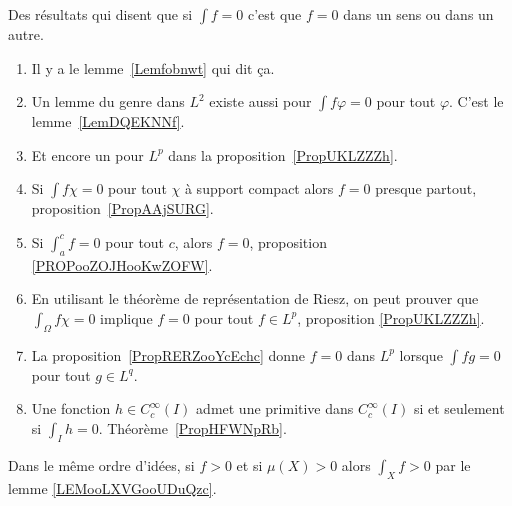 		\label{THEMEooDASVooWZLOjw}
Des résultats qui disent que si \( \int f=0\) c'est que \( f=0\) dans un sens ou dans un autre.
\begin{enumerate}
	\item
	      Il y a le lemme~\ref{Lemfobnwt} qui dit ça.
	\item
	      Un lemme du genre dans \( L^2\) existe aussi pour \( \int f\varphi=0\) pour tout \( \varphi\). C'est le lemme~\ref{LemDQEKNNf}.
	\item
	      Et encore un pour \( L^p\) dans la proposition~\ref{PropUKLZZZh}.
	\item
	      Si \( \int f\chi=0\) pour tout \( \chi\) à support compact alors \( f=0\) presque partout, proposition~\ref{PropAAjSURG}.
	\item
	      Si \( \int_a^cf=0\) pour tout \( c\), alors \( f=0\), proposition \ref{PROPooZOJHooKwZOFW}.
	\item
	      En utilisant le théorème de représentation de Riesz, on peut prouver que \( \int_{\Omega}f\chi=0\) implique \( f=0\) pour tout \( f\in L^p\), proposition \ref{PropUKLZZZh}.
	\item
	      La proposition~\ref{PropRERZooYcEchc} donne \( f=0\) dans \( L^p\) lorsque \( \int fg=0\) pour tout \( g\in L^q\).
	\item
	      Une fonction \( h\in C^{\infty}_c(I)\) admet une primitive dans \(  C^{\infty}_c(I)\) si et seulement si \( \int_Ih=0\). Théorème~\ref{PropHFWNpRb}.
\end{enumerate}

Dans le même ordre d'idées, si \( f>0\) et si \( \mu(X)>0\) alors \( \int_Xf>0\) par le lemme \ref{LEMooLXVGooUDuQzc}.
